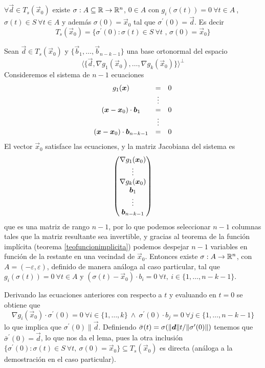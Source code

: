 \begin{lema}\label{lema-lagrange} 
$\forall \vec{d}\in T_s(\vec{x}_0)$ existe
$\sigma:A\subseteq\R\to\R^n$, $0\in A$ con $g_i (\sigma(t))=0\:
\forall t\in A\:$, $\sigma(t)\in S\: \forall t\in A$ y adem\'as 
$\sigma(0)=\vec{x}_0$ tal que $\sigma^{\prime}(0)=\vec{d}$. Es decir
\[T_s(\vec{x}_0)=\{\sigma^{\prime}(0) : \sigma(t)\in S\:\forall
t \text{ , } \sigma(0)=\vec{x}_0\}\]
\end{lema}

\begin{demostracion}
Sean $\vec{d}\in T_s(\vec{x}_0)$ y $\{\vec{b}_1,\ldots,\vec{b}_{n-k-1}\}$ una base
ortonormal del espacio
\[\langle\{\vec{d},\nabla g_1(\vec{x}_0),\ldots,\nabla
g_k(\vec{x}_0)\}\rangle^{\perp}\] Consideremos el sistema de $n-1$ ecuaciones
\[\begin{matrix}
g_1(\vec{x}) & = & 0 \cr \: & \vdots & \: \cr (\vec{x}-\vec{x}_0)\cdot \vec{b}_1 & = &
0 \cr \: & \vdots & \: \cr (\vec{x}-\vec{x}_0)\cdot \vec{b}_{n-k-1} & = & 0
\end{matrix}\]
El vector $\vec{x}_0$ satisface las ecuaciones, y la matriz Jacobiana del
sistema es
\[\begin{pmatrix}
\nabla g_1(\vec{x}_0) \cr \vdots \cr 
\nabla g_k(\vec{x}_0)\cr
\vec{b}_1\cr \vdots \cr \vec{b}_{n-k-1}
\end{pmatrix}\] que es una matriz de rango $n-1$,
por lo que podemos seleccionar $n-1$ columnas tales que la matriz
resultante sea invertible, y gracias al teorema de la funci\'on
impl\'icita (teorema \ref{teofuncionimplicita}) podemos despejar $n-1$ variables en funci\'on de la
restante en una vecindad de $\vec{x}_0$. Entonces existe
$\sigma:A\to \R^n$, con $A=(-\varepsilon,\varepsilon)$, definido de manera an\'aloga al
caso particular, tal que $g_i(\sigma(t))=0 \: \forall t\in A$ y
$(\sigma(t)-\vec{x}_0)\cdot b_i=0 \: \forall t,\:i\in\{1,\ldots,n-k-1\}$.

Derivando las ecuaciones anteriores con respecto a $t$ y evaluando
en $t=0$ se obtiene que
\[\nabla g_i(\vec{x}_0)\cdot
\sigma^{\prime}(0)=0 \: \forall i\in\{1,\ldots,k\} \:\wedge\: \sigma^{\prime}(0)\cdot
b_j=0 \: \forall j\in\{1,\ldots,n-k-1\}\] 
lo que implica que $\sigma^{\prime}(0)\parallel \vec{d}$. Definiendo
$\bar{\sigma}(t)=\sigma(\norm{\vec{d}}t/\norm{\sigma^{\prime}(0)})$
tenemos que $\bar{\sigma}^{\prime}(0)=\vec{d}$, lo que nos da el lema,
pues la otra inclusi\'on $\{\sigma^{\prime}(0) : \sigma(t)\in
S\:\forall t,\:\sigma(0)=\vec{x}_0\}\subseteq T_s(\vec{x}_0)$ es directa
(an\'aloga a la demostraci\'on en el caso particular).
\end{demostracion}

